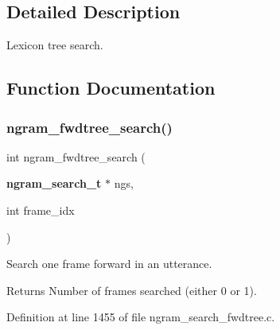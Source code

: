 \subsection{Detailed Description}
Lexicon tree search. 



\subsection{Function Documentation}
\mbox{\label{ngram__search__fwdtree_8c_a9e2828ba0d249424a234b6cf7d3ee530}} 
\subsubsection{ngram\+\_\+fwdtree\+\_\+search()}
{\footnotesize\ttfamily int ngram\+\_\+fwdtree\+\_\+search (\begin{DoxyParamCaption}\item[{\textbf{ ngram\+\_\+search\+\_\+t} $\ast$}]{ngs,  }\item[{int}]{frame\+\_\+idx }\end{DoxyParamCaption})}



Search one frame forward in an utterance. 

\begin{DoxyReturn}{Returns}
Number of frames searched (either 0 or 1). 
\end{DoxyReturn}


Definition at line 1455 of file ngram\+\_\+search\+\_\+fwdtree.\+c.

